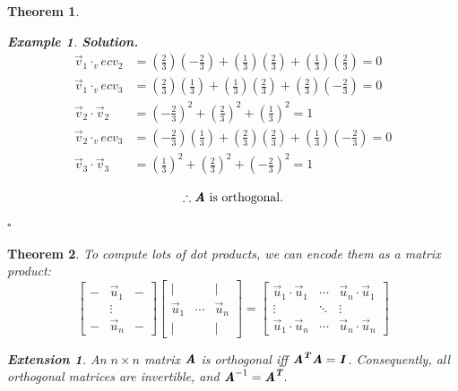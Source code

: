 \documentclass[12pt, a4paper]{article}
\newtheorem{thm}{Theorem}[subsection]
\newtheorem{eg}{Example}[subsection]
\newenvironment*{sol}{\indent\textbf{Solution. }}{\hfill{$\square$}\par}
\newtheorem*{ext}{\indent Extension}
\def\T{{\textbf{\emph{T}}}}
\def\vecv{\vec{v}}
\def\vecu{\vec{u}}
\def\matrixA{\textbf{\emph{A}}}
\def\matrixI{\textbf{\emph{I}}}
\begin{document}
\begin{thm}
\begin{eg}
\begin{sol}
$$\begin{aligned}
				\vecv_1\cdot_vecv_2&=\left(\frac{2}{3}\right)\left(-\frac{2}{3}\right)+\left(\frac{1}{3}\right)\left(\frac{2}{3}\right)+\left(\frac{1}{3}\right)\left(\frac{2}{3}\right)=0\\
				\vecv_1\cdot_vecv_3&=\left(\frac{2}{3}\right)\left(\frac{1}{3}\right)+\left(\frac{1}{3}\right)\left(\frac{2}{3}\right)+\left(\frac{2}{3}\right)\left(-\frac{2}{3}\right)=0\\
				\vecv_2\cdot\vecv_2&=\left(-\frac{2}{3}\right)^2+\left(\frac{2}{3}\right)^2+\left(\frac{1}{3}\right)^2=1	\\
				\vecv_2\cdot_vecv_3&=\left(-\frac{2}{3}\right)\left(\frac{1}{3}\right)+\left(\frac{2}{3}\right)\left(\frac{2}{3}\right)+\left(\frac{1}{3}\right)\left(-\frac{2}{3}\right)=0\\
				\vecv_3\cdot\vecv_3&=\left(\frac{1}{3}\right)^2+\left(\frac{2}{3}\right)^2+\left(-\frac{2}{3}\right)^2=1	\\
			\end{aligned}$$
			\[\therefore\matrixA\text{ is orthogonal.}\]
		\end{sol}
	\end{eg}
\end{thm}
\begin{thm}
	To compute lots of dot products, we can encode them as a matrix product: 
	\[\begin{bmatrix}-&\vecu_1&-\\&\vdots&\\-&\vecu_n&-\end{bmatrix}\begin{bmatrix}|&&|\\\vecu_1&\cdots&\vecu_n\\|&&|\end{bmatrix}=\begin{bmatrix}\vecu_1\cdot\vecu_1&\cdots&\vecu_n\cdot\vecu_1\\\vdots&\ddots&\vdots\\\vecu_1\cdot\vecu_n&\cdots&\vecu_n\cdot\vecu_n\end{bmatrix}\]
	\begin{ext}
		An $n\times n$ matrix $\matrixA$ is orthogonal \emph{iff} $\matrixA^\T\matrixA=\matrixI$. Consequently, all orthogonal matrices are invertible, and $\matrixA^{-1}=\matrixA^\T.$
	\end{ext}
\end{thm}
\end{document}

